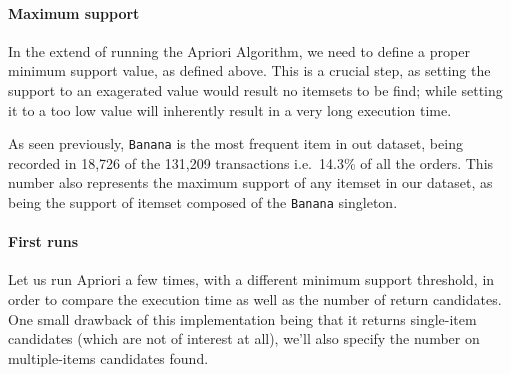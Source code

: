 \documentclass[11pt]{article}
\begin{document}
\hypertarget{maximum-support}{%
\paragraph{Maximum support}\label{maximum-support}}

In the extend of running the Apriori Algorithm, we need to define a
proper minimum support value, as defined above. This is a crucial step,
as setting the support to an exagerated value would result no itemsets
to be find; while setting it to a too low value will inherently result
in a very long execution time.

As seen previously, \texttt{Banana} is the most frequent item in out
dataset, being recorded in 18,726 of the 131,209 transactions
i.e.~14.3\% of all the orders. This number also represents the maximum
support of any itemset in our dataset, as being the support of itemset
composed of the \texttt{Banana} singleton.

\hypertarget{first-runs}{%
\paragraph{First runs}\label{first-runs}}

Let us run Apriori a few times, with a different minimum support
threshold, in order to compare the execution time as well as the number
of return candidates. One small drawback of this implementation being
that it returns single-item candidates (which are not of interest at
all), we'll also specify the number on multiple-items candidates found.
\end{document}
